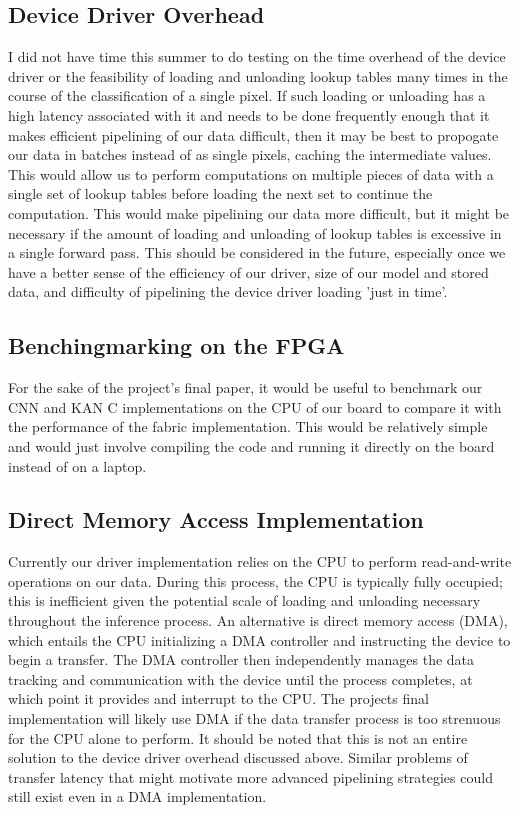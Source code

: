 \documentclass[psamsfonts]{amsart}
\theoremstyle{definition}
\theoremstyle{remark}
\numberwithin{equation}{section}
\begin{document}
\subsection{Device Driver Overhead}
I did not have time this summer to do testing on the time overhead of the device driver or the feasibility of loading and unloading lookup tables many times in the course of the classification of a single pixel. If such loading or unloading has a high latency associated with it and needs to be done frequently enough that it makes efficient pipelining of our data difficult, then it may be best to propogate our data in batches instead of as single pixels, caching the intermediate values. This would allow us to perform computations on multiple pieces of data with a single set of lookup tables before loading the next set to continue the computation. This would make pipelining our data more difficult, but it might be necessary if the amount of loading and unloading of lookup tables is excessive in a single forward pass. This should be considered in the future, especially once we have a better sense of the efficiency of our driver, size of our model and stored data, and difficulty of pipelining the device driver loading 'just in time'.

\subsection{Benchingmarking on the FPGA}
For the sake of the project's final paper, it would be useful to benchmark our CNN and KAN C implementations on the CPU of our board to compare it with the performance of the fabric implementation. This would be relatively simple and would just involve compiling the code and running it directly on the board instead of on a laptop.

\subsection{Direct Memory Access Implementation}
Currently our driver implementation relies on the CPU to perform read-and-write operations on our data. During this process, the CPU is typically fully occupied; this is inefficient given the potential scale of loading and unloading necessary throughout the inference process. An alternative is direct memory access (DMA), which entails the CPU initializing a DMA controller and instructing the device to begin a transfer. The DMA controller then independently manages the data tracking and communication with the device until the process completes, at which point it provides and interrupt to the CPU. The projects final implementation will likely use DMA if the data transfer process is too strenuous for the CPU alone to perform. It should be noted that this is not an entire solution to the device driver overhead discussed above. Similar problems of transfer latency that might motivate more advanced pipelining strategies could still exist even in a DMA implementation. %
\end{document}
